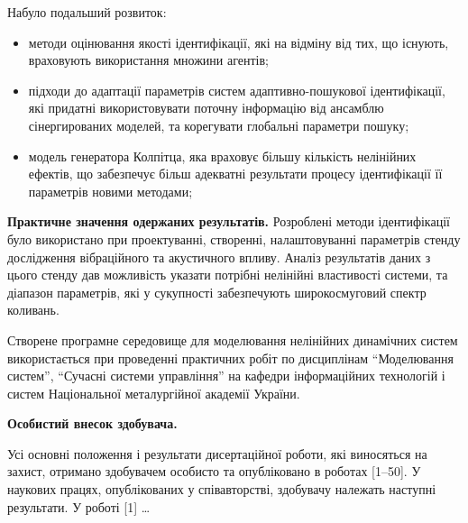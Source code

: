 \documentclass[a4paper,13pt]{atuaref}
\begin{document}
\noindent
Набуло подальший розвиток:
\begin{itemize}

  \item
  методи оцінювання якості ідентифікації,
  які на відміну від тих, що існують,
  враховують використання множини агентів;

  \item
  підходи до адаптації параметрів систем
  адаптивно-пошукової ідентифікації, які придатні використовувати поточну
  інформацію від ансамблю сінергированих моделей, та корегувати глобальні
  параметри пошуку;

  \item
    модель генератора Колпітца, яка враховує
    більшу кількість нелінійних ефектів,
    що забезпечує більш адекватні результати процесу
    ідентифікації її параметрів новими методами;

\end{itemize}


\smallskip
\textbf{Практичне значення одержаних результатів.}
Розроблені методи ідентифікації було використано
при проектуванні, створенні, налаштовуванні параметрів
стенду дослідження вібраційного та акустичного впливу.
Аналіз результатів даних з цього стенду
дав можливість указати потрібні нелінійні властивості системи,
та діапазон параметрів, які у сукупності
забезпечують широкосмуговий спектр коливань.

Створене програмне середовище для моделювання нелінійних динамічних систем
використається при проведенні практичних робіт по дисциплінам
``Моделювання систем'',
``Сучасні системи управління'' на кафедри інформаційних технологій
і систем Національної металургійної академії України.


\smallskip
\textbf{Особистий внесок здобувача.}

Усі основні положення і результати
дисертаційної роботи, які виносяться на захист, отримано здобувачем особисто та
опубліковано в роботах [1--50]. У наукових працях, опублікованих у співавторстві,
здобувачу належать наступні результати. У роботі [1] \ldots
\end{document}
